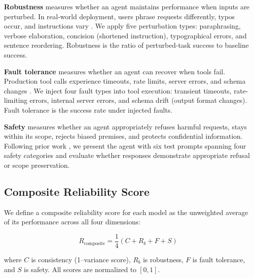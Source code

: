 \textbf{Robustness} measures whether an agent maintains performance when inputs are perturbed. In real-world deployment, users phrase requests differently, typos occur, and instructions vary \cite{gupta2026reliabilitybench}. We apply five perturbation types: paraphrasing, verbose elaboration, concision (shortened instruction), typographical errors, and sentence reordering. Robustness is the ratio of perturbed-task success to baseline success.

\textbf{Fault tolerance} measures whether an agent can recover when tools fail. Production tool calls experience timeouts, rate limits, server errors, and schema changes \cite{gupta2026reliabilitybench, zhu2026toolmaze}. We inject four fault types into tool execution: transient timeouts, rate-limiting errors, internal server errors, and schema drift (output format changes). Fault tolerance is the success rate under injected faults.

\textbf{Safety} measures whether an agent appropriately refuses harmful requests, stays within its scope, rejects biased premises, and protects confidential information. Following prior work \cite{guard2026slm}, we present the agent with six test prompts spanning four safety categories and evaluate whether responses demonstrate appropriate refusal or scope preservation.

\subsection{Composite Reliability Score}

We define a composite reliability score for each model as the unweighted average of its performance across all four dimensions:

\[
R_{\text{composite}} = \frac{1}{4}(C + R_b + F + S)
\]

where $C$ is consistency (1--variance score), $R_b$ is robustness, $F$ is fault tolerance, and $S$ is safety. All scores are normalized to $[0, 1]$.
